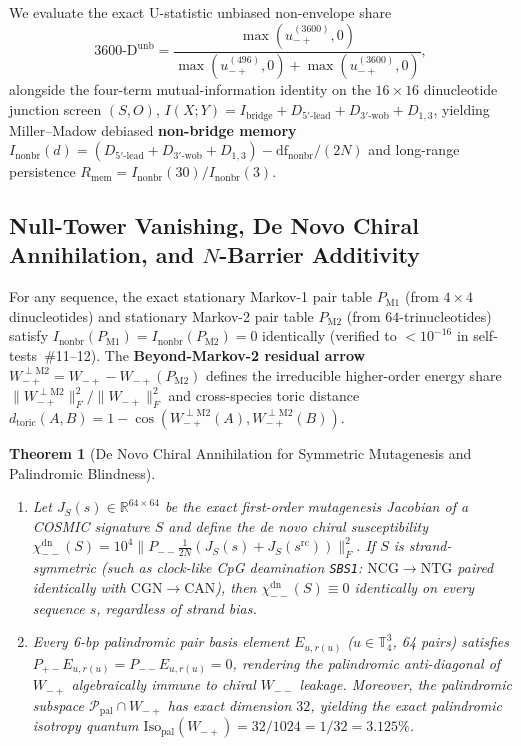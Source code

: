 \documentclass[11pt,a4paper]{article}
\renewcommand{\_}{\origunderscore\penalty200\relax}
\newtheorem{theorem}{Theorem}[section]
\theoremstyle{remark}
\begin{document}
We evaluate the exact U-statistic unbiased non-envelope share
\[
\mathrm{3600\text{-}D}^{\mathrm{unb}} = \frac{\max(u_{-+}^{(3600)}, 0)}{\max(u_{-+}^{(496)}, 0) + \max(u_{-+}^{(3600)}, 0)},
\]
alongside the four-term mutual-information identity on the $16\times 16$ dinucleotide junction screen $(S,O)$, $I(X;Y) = I_{\mathrm{bridge}} + D_{5'\text{-lead}} + D_{3'\text{-wob}} + D_{1,3}$, yielding Miller--Madow debiased \textbf{non-bridge memory} $I_{\mathrm{nonbr}}(d) = (D_{5'\text{-lead}} + D_{3'\text{-wob}} + D_{1,3}) - \mathrm{df}_{\mathrm{nonbr}}/(2N)$ and long-range persistence $R_{\mathrm{mem}} = I_{\mathrm{nonbr}}(30)/I_{\mathrm{nonbr}}(3)$.

\subsection{Null-Tower Vanishing, De Novo Chiral Annihilation, and \texorpdfstring{$N$}{N}-Barrier Additivity}
For any sequence, the exact stationary Markov-1 pair table $P_{\mathrm{M1}}$ (from $4\times 4$ dinucleotides) and stationary Markov-2 pair table $P_{\mathrm{M2}}$ (from $64$-trinucleotides) satisfy $I_{\mathrm{nonbr}}(P_{\mathrm{M1}}) = I_{\mathrm{nonbr}}(P_{\mathrm{M2}}) = 0$ identically (verified to $<10^{-16}$ in self-tests~\#11--12).
The \textbf{Beyond-Markov-2 residual arrow} $W_{-+}^{\perp\mathrm{M2}} = W_{-+} - W_{-+}(P_{\mathrm{M2}})$ defines the irreducible higher-order energy share $\|W_{-+}^{\perp\mathrm{M2}}\|_F^2 /\allowbreak \|W_{-+}\|_F^2$ and cross-species toric distance $d_{\mathrm{toric}}(A,B) = 1 - \cos(W_{-+}^{\perp\mathrm{M2}}(A),\allowbreak W_{-+}^{\perp\mathrm{M2}}(B))$.

\begin{theorem}[De Novo Chiral Annihilation for Symmetric Mutagenesis and Palindromic Blindness]
\label{thm:sbs1_pal}
\leavevmode
\begin{enumerate}
  \item Let $J_S(s) \in \mathbb{R}^{64\times 64}$ be the exact first-order mutagenesis Jacobian of a COSMIC signature $S$ and define the de novo chiral susceptibility $\chi_{--}^{\mathrm{dn}}(S) = 10^4 \|P_{--}\tfrac{1}{2N}(J_S(s) + J_S(s^{\mathrm{rc}}))\|_F^2$.
  If $S$ is strand-symmetric (such as clock-like CpG deamination \texttt{SBS1}: $\mathrm{NCG}\to\mathrm{NTG}$ paired identically with $\mathrm{CGN}\to\mathrm{CAN}$), then $\chi_{--}^{\mathrm{dn}}(S) \equiv 0$ identically on every sequence $s$, regardless of strand bias.
  \item Every 6-bp palindromic pair basis element $E_{u, r(u)}$ ($u \in \mathbb{T}_4^3$, 64 pairs) satisfies $P_{+-} E_{u,r(u)} = P_{--} E_{u,r(u)} = 0$, rendering the palindromic anti-diagonal of $W_{-+}$ algebraically immune to chiral $W_{--}$ leakage. Moreover, the palindromic subspace $\mathcal{P}_{\mathrm{pal}} \cap W_{-+}$ has exact dimension $32$, yielding the exact palindromic isotropy quantum $\mathrm{Iso}_{\mathrm{pal}}(W_{-+}) = 32/1024 = 1/32 = 3.125\%$.
\end{enumerate}
\end{theorem}
\end{document}
